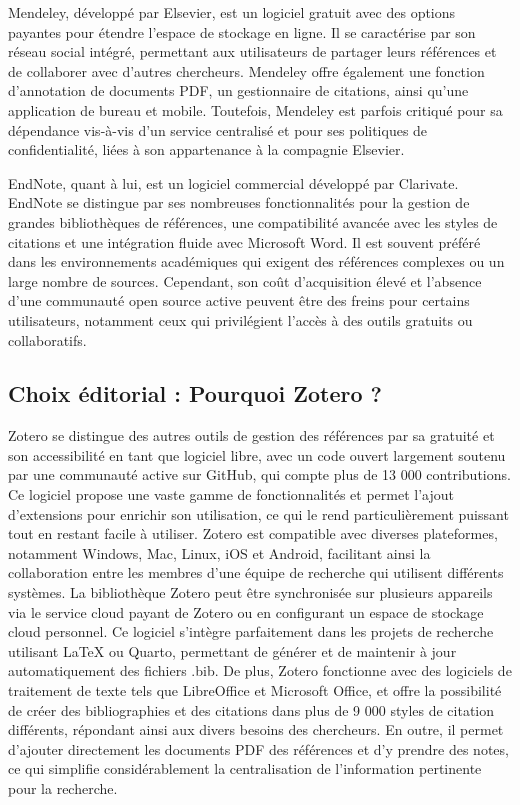 \documentclass[
  letterpaper,
  DIV=11,
  numbers=noendperiod]{scrreprt}
\begin{document}
Mendeley, développé par Elsevier, est un logiciel gratuit avec des
options payantes pour étendre l'espace de stockage en ligne. Il se
caractérise par son réseau social intégré, permettant aux utilisateurs
de partager leurs références et de collaborer avec d'autres chercheurs.
Mendeley offre également une fonction d'annotation de documents PDF, un
gestionnaire de citations, ainsi qu'une application de bureau et mobile.
Toutefois, Mendeley est parfois critiqué pour sa dépendance vis-à-vis
d'un service centralisé et pour ses politiques de confidentialité, liées
à son appartenance à la compagnie Elsevier.

EndNote, quant à lui, est un logiciel commercial développé par
Clarivate. EndNote se distingue par ses nombreuses fonctionnalités pour
la gestion de grandes bibliothèques de références, une compatibilité
avancée avec les styles de citations et une intégration fluide avec
Microsoft Word. Il est souvent préféré dans les environnements
académiques qui exigent des références complexes ou un large nombre de
sources. Cependant, son coût d'acquisition élevé et l'absence d'une
communauté open source active peuvent être des freins pour certains
utilisateurs, notamment ceux qui privilégient l'accès à des outils
gratuits ou collaboratifs.

\subsection{Choix éditorial : Pourquoi Zotero
?}\label{choix-uxe9ditorial-pourquoi-zotero}

Zotero se distingue des autres outils de gestion des références par sa
gratuité et son accessibilité en tant que logiciel libre, avec un code
ouvert largement soutenu par une communauté active sur GitHub, qui
compte plus de 13 000 contributions. Ce logiciel propose une vaste gamme
de fonctionnalités et permet l'ajout d'extensions pour enrichir son
utilisation, ce qui le rend particulièrement puissant tout en restant
facile à utiliser. Zotero est compatible avec diverses plateformes,
notamment Windows, Mac, Linux, iOS et Android, facilitant ainsi la
collaboration entre les membres d'une équipe de recherche qui utilisent
différents systèmes. La bibliothèque Zotero peut être synchronisée sur
plusieurs appareils via le service cloud payant de Zotero ou en
configurant un espace de stockage cloud personnel. Ce logiciel s'intègre
parfaitement dans les projets de recherche utilisant LaTeX ou Quarto,
permettant de générer et de maintenir à jour automatiquement des
fichiers .bib. De plus, Zotero fonctionne avec des logiciels de
traitement de texte tels que LibreOffice et Microsoft Office, et offre
la possibilité de créer des bibliographies et des citations dans plus de
9 000 styles de citation différents, répondant ainsi aux divers besoins
des chercheurs. En outre, il permet d'ajouter directement les documents
PDF des références et d'y prendre des notes, ce qui simplifie
considérablement la centralisation de l'information pertinente pour la
recherche.
\end{document}
